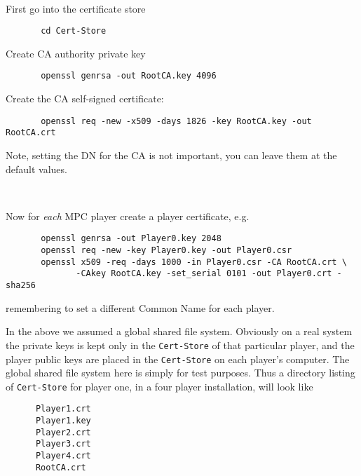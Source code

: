 ~~

\noindent
First go into the certificate store
\begin{verbatim}
       cd Cert-Store
\end{verbatim}
Create CA authority private key
\begin{verbatim}
       openssl genrsa -out RootCA.key 4096
\end{verbatim}
Create the CA self-signed certificate:
\begin{verbatim}
       openssl req -new -x509 -days 1826 -key RootCA.key -out RootCA.crt
\end{verbatim}
Note, setting the DN for the CA is not important, you can leave them
at the default values.

~~

\noindent
Now for {\em each} MPC player create a player certificate, e.g.
\begin{verbatim}
       openssl genrsa -out Player0.key 2048
       openssl req -new -key Player0.key -out Player0.csr
       openssl x509 -req -days 1000 -in Player0.csr -CA RootCA.crt \
              -CAkey RootCA.key -set_serial 0101 -out Player0.crt -sha256
\end{verbatim}
remembering to set a different Common Name for each player.

In the above we assumed a global shared file system.  Obviously on
a real system the private keys is kept only in the
\verb+Cert-Store+ of that particular player, and the player public
keys are placed in the \verb+Cert-Store+ on each player's
computer. The global shared file system here is simply for test
purposes. Thus a directory listing of \verb+Cert-Store+
for player one, in a four player installation, will look like
\begin{verbatim}
      Player1.crt
      Player1.key
      Player2.crt
      Player3.crt
      Player4.crt
      RootCA.crt
\end{verbatim}


